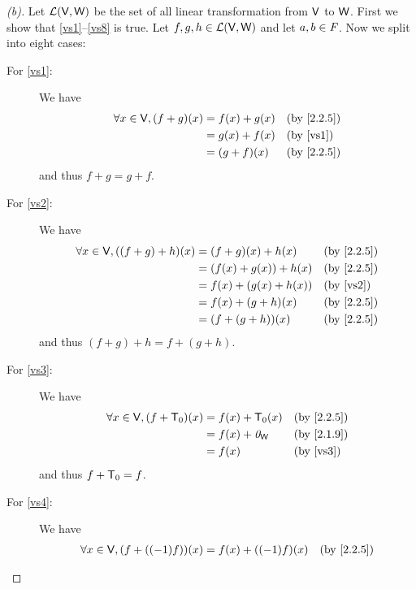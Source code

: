 \begin{proof}[(b)]
  Let \(\mathcal{L}(\mathsf{V}, \mathsf{W})\) be the set of all linear transformation from \(\mathsf{V}\) to \(\mathsf{W}\).
  First we show that \ref{vs1}--\ref{vs8} is true.
  Let \(f, g, h \in \mathcal{L}(\mathsf{V}, \mathsf{W})\) and let \(a, b \in \mathit{F}\).
  Now we split into eight cases:
  \begin{description}
    \item[For \ref{vs1}:] We have
      \begin{align*}
        \forall x \in \V, (f + g)(x) & = f(x) + g(x) &  & \by{2.2.5}            \\
                                     & = g(x) + f(x) &  & \text{(by \ref{vs1})} \\
                                     & = (g + f)(x)  &  & \by{2.2.5}
      \end{align*}
      and thus \(f + g = g + f\).
    \item[For \ref{vs2}:] We have
      \begin{align*}
        \forall x \in \V, ((f + g) + h)(x) & = (f + g)(x) + h(x)    &  & \by{2.2.5}            \\
                                           & = (f(x) + g(x)) + h(x) &  & \by{2.2.5}            \\
                                           & = f(x) + (g(x) + h(x)) &  & \text{(by \ref{vs2})} \\
                                           & = f(x) + (g + h)(x)    &  & \by{2.2.5}            \\
                                           & = (f + (g + h))(x)     &  & \by{2.2.5}
      \end{align*}
      and thus \((f + g) + h = f + (g + h)\).
    \item[For \ref{vs3}:] We have
      \begin{align*}
        \forall x \in \V, (f + \zT)(x) & = f(x) + \zT(x)   &  & \by{2.2.5}            \\
                                       & = f(x) + \zv_{\W} &  & \by{2.1.9}            \\
                                       & = f(x)            &  & \text{(by \ref{vs3})}
      \end{align*}
      and thus \(f + \mathsf{T}_0 = f\).
    \item[For \ref{vs4}:] We have
      \begin{align*}
        \forall x \in \V, (f + ((-1)f))(x) & = f(x) + ((-1)f)(x) &  & \by{2.2.5}            \\

\end{align*}
\end{description}
\end{proof}
